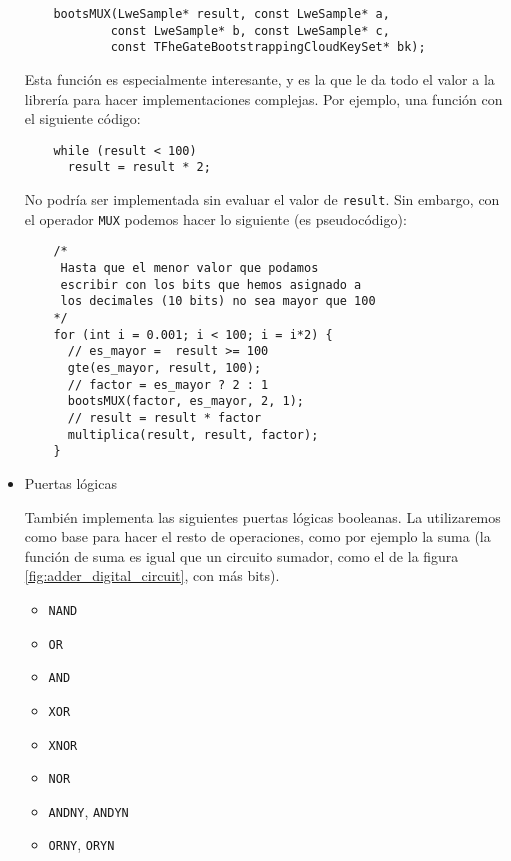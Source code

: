 \begin{itemize}
  \begin{verbatim}
    bootsMUX(LweSample* result, const LweSample* a,
            const LweSample* b, const LweSample* c,
            const TFheGateBootstrappingCloudKeySet* bk);
  \end{verbatim}

  Esta función es especialmente interesante, y es la que le da todo el valor a la librería para hacer implementaciones complejas. Por ejemplo, una función con el siguiente código:

  \begin{verbatim}
    while (result < 100)
      result = result * 2;
  \end{verbatim}

  No podría ser implementada sin evaluar el valor de \verb|result|. Sin embargo, con el operador \verb|MUX| podemos hacer lo siguiente (es pseudocódigo):

  \begin{verbatim}
    /*
     Hasta que el menor valor que podamos
     escribir con los bits que hemos asignado a
     los decimales (10 bits) no sea mayor que 100
    */
    for (int i = 0.001; i < 100; i = i*2) {
      // es_mayor =  result >= 100
      gte(es_mayor, result, 100);
      // factor = es_mayor ? 2 : 1
      bootsMUX(factor, es_mayor, 2, 1);
      // result = result * factor
      multiplica(result, result, factor);
    }
  \end{verbatim}

  \item Puertas lógicas

  También implementa las siguientes puertas lógicas booleanas. La utilizaremos como base para hacer el resto de operaciones, como por ejemplo la suma (la función de suma es igual que un circuito sumador, como el de la figura \ref{fig:adder_digital_circuit}, con más bits).

  \begin{itemize}
    \item \verb|NAND|

    \item \verb|OR|

    \item \verb|AND|

    \item \verb|XOR|

    \item \verb|XNOR|

    \item \verb|NOR|

    \item \verb|ANDNY|, \verb|ANDYN|

    \item \verb|ORNY|, \verb|ORYN|

  \end{itemize}

\end{itemize}

